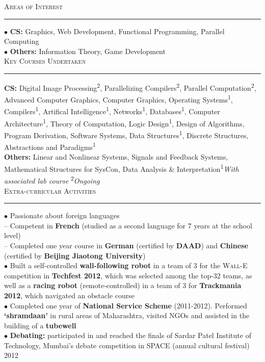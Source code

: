 \documentclass[a4paper,9pt]{article}
\begin{document}
\Large{\textsc{Areas of Interest}}\vspace{1.5pt}
\hrule\vspace{0.25cm}
\normalsize
$\bullet$ \textbf{CS:} Graphics, Web Development, Functional Programming, Parallel Computing\\
$\bullet$ \textbf{Others:} Information Theory, Game Development\\

\Large{\textsc{Key Courses Undertaken}}\vspace{1.5pt}
\hrule\vspace{0.25cm}
\normalsize
\textbf{CS:} Digital Image Processing\textsuperscript{2}, Parallelizing Compilers\textsuperscript{2}, Parallel Computation\textsuperscript{2}, Advanced Computer Graphics, Computer Graphics, Operating Systems\textsuperscript{1}, Compilers\textsuperscript{1}, Artifical Intelligence\textsuperscript{1}, Networks\textsuperscript{1}, Databases\textsuperscript{1}, Computer Architecture\textsuperscript{1}, Theory of Computation, Logic Design\textsuperscript{1}, Design of Algorithms, Program Derivation, Software Systems, Data Structures\textsuperscript{1}, Discrete Structures, Abstractions and Paradigms\textsuperscript{1}\\
\textbf{Others:} Linear and Nonlinear Systems, Signals and Feedback Systems, Mathematical Structures for SysCon, Data Analysis \& Interpretation\hfill\textsuperscript{1}\emph{With associated lab course} \textsuperscript{2}\emph{Ongoing}\\

\Large{\textsc{Extra-curricular Activities}}\vspace{1.5pt}
\hrule\vspace{0.25cm}
\normalsize
$\bullet$ Passionate about foreign languages\\
-- Competent in \textbf{French} (studied as a second language for 7 years at the school level)\\
-- Completed one year course in \textbf{German} (certified by \textbf{DAAD}) and \textbf{Chinese} (certified by \textbf{Beijing Jiaotong University})\\
$\bullet$ Built a self-controlled \textbf{wall-following robot} in a team of 3 for the \textsc{Wall-E} competition in \textbf{Techfest 2012}, which was selected among the top-32 teams, as well as a \textbf{racing robot} (remote-controlled) in a team of 3 for \textbf{Trackmania 2012}, which navigated an obstacle course\\
$\bullet$ Completed one year of \textbf{National Service Scheme} (2011-2012). Performed \textbf{‘shramdaan’} in rural areas of Maharashtra, visited NGOs and assisted in the building of a \textbf{tubewell}\\
$\bullet$ \textbf{Debating:} participated in and reached the finals of Sardar Patel Institute of Technology, Mumbai's debate competition in SPACE (annual cultural festival) 2012\\
\end{document}
